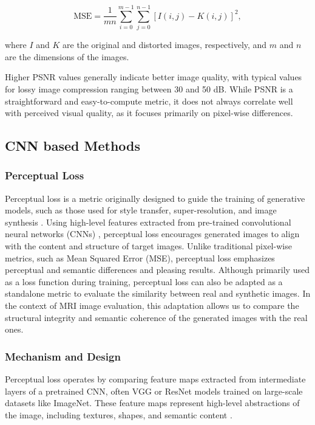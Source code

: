 \documentclass[a4paper,12pt]{article}
\begin{document}
$$
\text{MSE} = \frac{1}{mn} \sum_{i=0}^{m-1} \sum_{j=0}^{n-1} [I(i,j) - K(i,j)]^2,
$$

where \( I \) and \( K \) are the original and distorted images, respectively, and \( m \) and \( n \) are the dimensions of the images.

Higher PSNR values generally indicate better image quality, with typical values for lossy image compression ranging between 30 and 50 dB. While PSNR is a straightforward and easy-to-compute metric, it does not always correlate well with perceived visual quality, as it focuses primarily on pixel-wise differences.

\subsection{CNN based Methods}
\subsubsection{Perceptual Loss}

Perceptual loss is a metric originally designed to guide the training of generative models, such as those used for style transfer, super-resolution, and image synthesis \cite{johnson_perceptual_2016}. Using high-level features extracted from pre-trained convolutional neural networks (CNNs) \cite{oshea_introduction_2015}, perceptual loss encourages generated images to align with the content and structure of target images. Unlike traditional pixel-wise metrics, such as Mean Squared Error (MSE), perceptual loss emphasizes perceptual and semantic differences and pleasing results. Although primarily used as a loss function during training, perceptual loss can also be adapted as a standalone metric to evaluate the similarity between real and synthetic images. In the context of MRI image evaluation, this adaptation allows us to compare the structural integrity and semantic coherence of the generated images with the real ones.

\subsubsection{Mechanism and Design}

Perceptual loss operates by comparing feature maps extracted from intermediate layers of a pretrained CNN, often VGG or ResNet models trained on large-scale datasets like ImageNet. These feature maps represent high-level abstractions of the image, including textures, shapes, and semantic content \cite{simonyan_very_2015, krizhevsky_imagenet_2017, he_deep_2015}.
\end{document}
